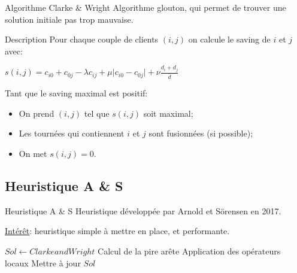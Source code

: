 \documentclass{beamer}
\begin{document}
\begin{frame}{Algorithme Clarke \& Wright}
Algorithme glouton, qui permet de trouver une solution initiale pas trop mauvaise. 

\begin{block}{Description}
Pour chaque couple de clients $(i,j)$ on calcule le saving de $i$ et $j$ avec:
\begin{center}
$s(i,j) = c_{i0} + c_{0j} - \lambda c_{ij} + \mu \vert c_{i0} - c_{0j} \vert + \nu \frac{d_i + d_j}{\overline{d}}$
\end{center}
Tant que le saving maximal est positif:
\begin{itemize}
\item On prend $(i,j)$ tel que $s(i,j)$ soit maximal;
\item Les tournées qui contiennent $i$ et $j$ sont fusionnées (si possible);
\item On met $s(i,j) = 0$.
\end{itemize} 

\end{block}
\end{frame}

\subsection{Heuristique A \& S}

\begin{frame}{Heuristique A \& S}
Heuristique développée par Arnold et Sörensen en 2017. 

\underline{Intérêt}: heuristique simple à mettre en place, et performante.

\begin{algorithm}[H]
\DontPrintSemicolon %
$Sol \gets Clarke and Wright$\;
 {
	Calcul de la pire arête\;
	Application des opérateurs locaux\;
	 {
		Mettre à jour $Sol$\;
	}
}
\;
\caption{{\sc AS} applique l'heuristique A\& S au problème considéré}
\label{algo:AS}
\end{algorithm}

\end{frame}
\end{document}
